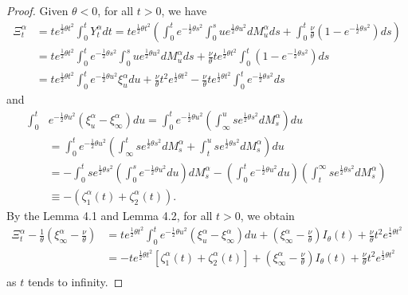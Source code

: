 \documentclass[11pt]{amsart}
\theoremstyle{plain}
\numberwithin{equation}{section}
\begin{document}
\begin{proof}
Given $\theta<0$, for all $t>0$, we have 
\begin{equation*}
\begin{aligned}
\Xi_t^\alpha&=te^{\frac{1}{2}\theta t^2}\int_0^t Y_t^\alpha dt=te^{\frac{1}{2}\theta t^2}\left(\int_0^t e^{-\frac{1}{2}\theta s^2}\int_0^s ue^{\frac{1}{2}\theta u^2}dM_u^\alpha ds+\int_0^t \frac{\nu}{\theta}(1-e^{-\frac{1}{2}\theta s^2})ds\right)\\
&=te^{\frac{1}{2}\theta t^2}\int_0^t e^{-\frac{1}{2}\theta s^2}\int_0^s ue^{\frac{1}{2}\theta u^2}dM_u^\alpha ds+\frac{\nu}{\theta}te^{\frac{1}{2}\theta t^2}\int_0^t (1-e^{-\frac{1}{2}\theta s^2})ds\\
&=te^{\frac{1}{2}\theta t^2}\int_0^t e^{-\frac{1}{2}\theta u^2}\xi_u^\alpha du +\frac{\nu}{\theta}t^2e^{\frac{1}{2}\theta t^2}-\frac{\nu}{\theta}te^{\frac{1}{2}\theta t^2}\int_0^t e^{-\frac{1}{2}\theta s^2}ds
\end{aligned}
\end{equation*}
and 
\begin{equation*}
\begin{aligned}
\int_0^t &e^{-\frac{1}{2}\theta u^2}(\xi_u^\alpha-\xi_\infty^\alpha)du=\int_0^t e^{-\frac{1}{2}\theta u^2}\left(\int_\infty^u se^{\frac{1}{2}\theta s^2}dM_s^\alpha\right)du\\
&=\int_0^t e^{-\frac{1}{2}\theta u^2}\left(\int_\infty^t se^{\frac{1}{2}\theta s^2}dM_s^\alpha+\int_t^u se^{\frac{1}{2}\theta s^2}dM_s^\alpha\right)du\\
&=-\int_0^t se^{\frac{1}{2}\theta s^2}\left(\int_0^s e^{-\frac{1}{2}\theta u^2}du\right)dM_s^\alpha-\left(\int_0^t e^{-\frac{1}{2}\theta u^2}du\right)\left(\int_t^\infty se^{\frac{1}{2}\theta s^2}dM_s^\alpha\right)\\
&\equiv -(\zeta_1^\alpha(t)+\zeta_2^\alpha(t)).
\end{aligned}
\end{equation*}
By the Lemma 4.1 and Lemma 4.2, for all $t>0$, we obtain
\begin{equation*}
\begin{aligned}
\Xi_t^\alpha-\frac{1}{\theta}\left(\xi_\infty^\alpha-\frac{\nu}{\theta}\right)&=te^{\frac{1}{2}\theta t^2}\int_0^t e^{-\frac{1}{2}\theta u^2}(\xi_u^\alpha-\xi_\infty^\alpha)du+\left(\xi_\infty^\alpha-\frac{\nu}{\theta}\right)I_\theta(t)+\frac{\nu}{\theta}t^2 e^{\frac{1}{2}\theta t^2}\\
&=-te^{\frac{1}{2}\theta t^2}[\zeta_1^\alpha(t)+\zeta_2^\alpha(t)]+\left(\xi_\infty^\alpha-\frac{\nu}{\theta}\right)I_\theta(t)+\frac{\nu}{\theta}t^2 e^{\frac{1}{2}\theta t^2}\\
\end{aligned}
\end{equation*}
as $t$ tends to infinity. 


\end{proof}
\end{document}
